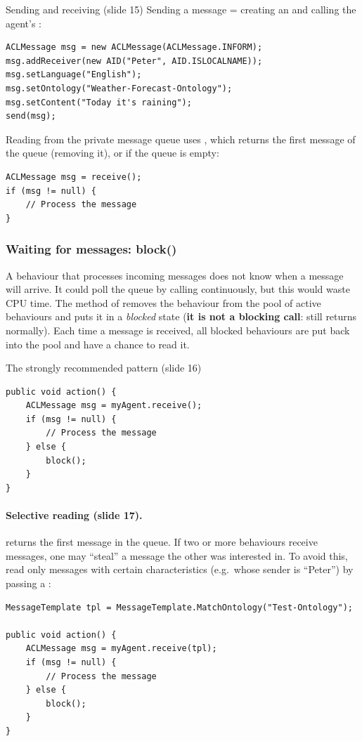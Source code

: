 \begin{nbfact}{Sending and receiving (slide 15)}
Sending a message = creating an  and calling the agent's :
\begin{verbatim}
ACLMessage msg = new ACLMessage(ACLMessage.INFORM);
msg.addReceiver(new AID("Peter", AID.ISLOCALNAME));
msg.setLanguage("English");
msg.setOntology("Weather-Forecast-Ontology");
msg.setContent("Today it's raining");
send(msg);
\end{verbatim}
Reading from the private message queue uses , which returns the first message
of the queue (removing it), or  if the queue is empty:
\begin{verbatim}
ACLMessage msg = receive();
if (msg != null) {
    // Process the message
}
\end{verbatim}
\end{nbfact}

\subsubsection{Waiting for messages: block()}

A behaviour that processes incoming messages does not know when a message will arrive. It
could poll the queue by calling  continuously, but this would waste
CPU time. The  method of  removes the behaviour from the pool of
active behaviours and puts it in a \emph{blocked} state (\textbf{it is not a blocking
call}:  still returns normally). Each time a message is received, all blocked
behaviours are put back into the pool and have a chance to read it.

\begin{nbfact}{The strongly recommended pattern (slide 16)}
\begin{verbatim}
public void action() {
    ACLMessage msg = myAgent.receive();
    if (msg != null) {
        // Process the message
    } else {
        block();
    }
}
\end{verbatim}
\end{nbfact}

\paragraph{Selective reading (slide 17).}  returns the first message in the
queue. If two or more behaviours receive messages, one may ``steal'' a message the other was
interested in. To avoid this, read only messages with certain characteristics (e.g.\ whose
sender is ``Peter'') by passing a :
\begin{verbatim}
MessageTemplate tpl = MessageTemplate.MatchOntology("Test-Ontology");

public void action() {
    ACLMessage msg = myAgent.receive(tpl);
    if (msg != null) {
        // Process the message
    } else {
        block();
    }
}
\end{verbatim}

